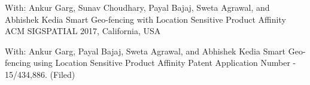 \begin{cventries}
	\cventry
		{With: 	Ankur Garg, Sunav Choudhary, Payal Bajaj, Sweta Agrawal, and Abhishek Kedia}
		{Smart Geo-fencing with Location Sensitive Product Affinity}
		{}
		{}
		{ACM SIGSPATIAL 2017, California, USA}
\end{cventries}
\begin{cventries}	
	\cventry
		{With: Ankur Garg, Payal Bajaj, Sweta Agrawal, and Abhishek Kedia}
		{Smart Geo-fencing using Location Sensitive Product Affinity}
		{}
		{}
		{Patent Application Number - 15/434,886. (Filed)}
\end{cventries}
%
%
%
%	
%	
%	
